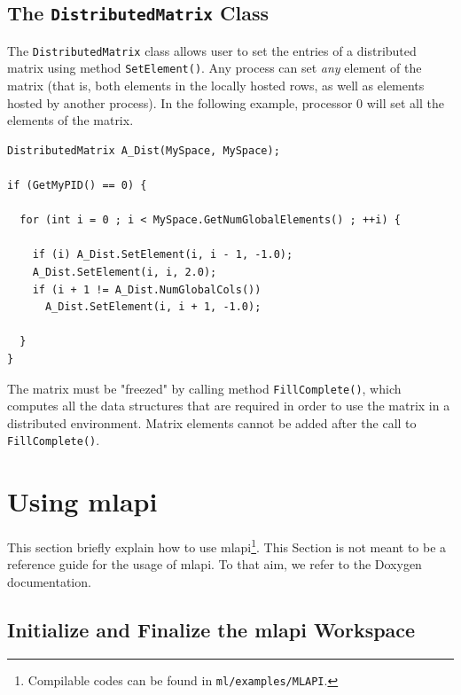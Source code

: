 \documentclass{article}[11pt]
\newcommand{\MLAPI}  {{\sc mlapi }}
\newcommand{\MLAPIns}  {{\sc mlapi}}
\begin{document}
\subsection{The {\tt DistributedMatrix} Class}
\label{sec:distributedmatrix}

The {\tt DistributedMatrix} class allows user to set the entries of a
distributed matrix using method {\tt SetElement()}. Any process can set {\sl
  any} element of the matrix (that is, both elements in the locally hosted
rows, as well as elements hosted by another process). In the following
  example, processor 0 will set all the elements of the matrix.
\begin{verbatim}
DistributedMatrix A_Dist(MySpace, MySpace);

if (GetMyPID() == 0) {

  for (int i = 0 ; i < MySpace.GetNumGlobalElements() ; ++i) {

    if (i) A_Dist.SetElement(i, i - 1, -1.0);
    A_Dist.SetElement(i, i, 2.0);
    if (i + 1 != A_Dist.NumGlobalCols())
      A_Dist.SetElement(i, i + 1, -1.0);

  }
}
\end{verbatim}
The matrix must be "freezed" by calling method {\tt FillComplete()}, which
computes all the data structures that are required in order to use the matrix
in a distributed environment. Matrix elements cannot be added after the call
to {\tt FillComplete()}.

\section{Using \MLAPI}
\label{sec:usage}

This section briefly explain how to use \MLAPIns\footnote{Compilable codes
can be found in {\tt ml/examples/MLAPI}.}. This Section is not meant to be a
reference guide for the usage of \MLAPIns. To that aim, we refer to the
Doxygen documentation.

\subsection{Initialize and Finalize the \MLAPI Workspace}
\label{sec:workspace}
\end{document}
